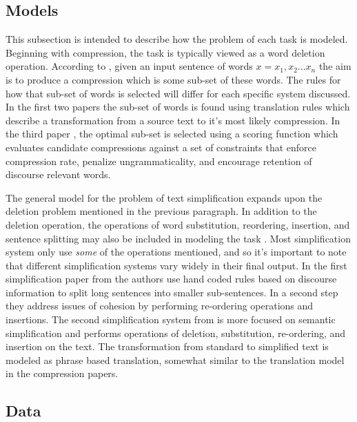 {\subsection{Models}
{This subsection is intended to describe how the problem of each task is modeled.  Beginning with compression, the task is typically viewed as a word deletion operation.  According to \citet{Knight:2002:SBS:604203.604207}, given an input sentence of words $x= x_{1},x_{2}...x_{n}$ the aim is to produce a compression which is some sub-set of these words. The rules for how that sub-set of words is selected will differ for each specific system discussed.   In the first two papers  \citep{galley2007lexicalized,knight2000statistics}  the sub-set of words is found using translation rules which describe a transformation from a source text to it's most likely compression. In the third paper \citep{Clarke:2010:DCD:1950488.1950493}, the optimal sub-set is selected using a scoring function which evaluates candidate compressions against a set of constraints that enforce compression rate, penalize ungrammaticality, and encourage retention of discourse relevant words.}


{The general model for the problem of text simplification expands upon the deletion problem mentioned in the previous paragraph.  In addition to the deletion operation, the operations of word substitution, reordering, insertion, and sentence splitting may also be included in modeling the task \citep{Siddharthan2006,coster-kauchak:2011:T2TW-2011}.  Most simplification system only use \textit{some} of the operations mentioned, and so it's important to note that different simplification systems vary widely in their final output.   In the first simplification paper from \citet{Siddharthan2006} the authors use hand coded rules based on discourse information to split long sentences  into smaller sub-sentences.  In a second step they address issues of cohesion by performing re-ordering operations and insertions.   The second simplification system from \citet{coster-kauchak:2011:T2TW-2011} is more focused on semantic simplification and performs operations of deletion, substitution, re-ordering, and insertion on the text. The transformation from standard to simplified text is modeled as phrase based translation, somewhat similar to the translation model in the compression papers.}


\iffalse
\subsection{Data}

}
